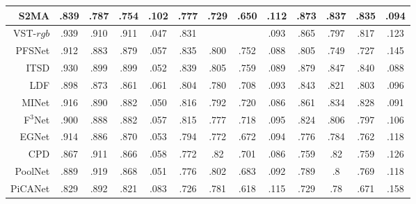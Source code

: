 \begin{table}[p]
{\begin{tabular}{rcccccccccccc}
			S2MA    \upcite{liu2020learning} 
			& .839 & .787 & .754 & 	.102 
			& .777 & .729 & .650 & .112 
			& .873 & .837 &	.835 & .094 \\
			
			
			\midrule[1pt] 
			
			
			VST-$rgb$ \upcite{liu2021visual} 
			& .939 & .910 & .911 & .047
			& .831 & \dashuline{.808} & \dashuline{.763} & .093 
			& .865 & .797 & .817 & .123 
			\\ 
			
			PFSNet \upcite{ma2021pyramidal}
			& .912 & .883 & .879 & .057 
			& .835 & .800 & .752 & .088 
			& .805 & .749 & .727 & .145 
			\\ 
			
			
			ITSD \upcite{zhou2020interactive} 
			& .930 & .899 & .899 & .052 
			& .839 & .805 & .759 & .089 
			& .879 & .847 & .840 & .088 
			\\ 
			
			
			
			LDF \upcite{wei2020label} 
			& .898 & .873 & .861 & .061 
			& .804 & .780 & .708 & .093 
			& .843 & .821 & .803 & .096 
			\\ 
			
			
			MINet \upcite{pang2020multi} 
			& .916 & .890 & .882 & .050 
			& .816 & .792 & .720 & .086 
			& .861 & .834 & .828 & .091 
			\\ 
			
			F$^{3}$Net  \upcite{wei2020f3net}
			& .900 & .888 & .882 & .057 
			& .815 & .777 & .718 & .095 
			& .824 & .806 & .797 & .106 
			\\ 
			
			
			EGNet   \upcite{zhao2019egnet}
			& .914 & .886 & .870 & .053 
			& .794 & .772 & .672 & .094 
			& .776 & .784 & .762 & .118 
			\\ 
			
			CPD  \upcite{wu2019cascaded}
			& .867 & .911 & .866 & .058 
			& .772 & .82  & .701 & .086 
			& .759 & .82  & .759 & .126 \\
			
			PoolNet \upcite{liu2019simple}
			& .889 & .919 & .868 & .051 
			& .776 & .802 & .683 & .092 
			& .789 & .8   & .769 & .118 \\
			
			PiCANet \upcite{liu2018picanet}
			& .829 & .892 & .821 & .083 
			& .726 & .781 & .618 & .115 
			& .729 & .78  & .671 & .158 \\
			

\end{tabular}}
\end{table}
